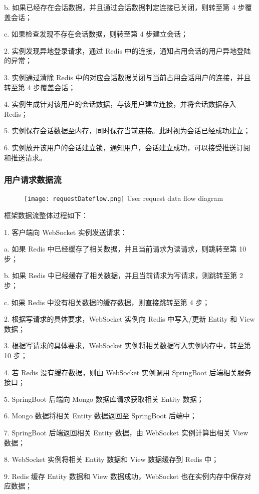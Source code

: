 \quad{}b. 如果已经存在会话数据，并且通过会话数据判定连接已关闭，则转至第 4 步覆盖会话；

\quad{}c. 如果检查发现不存在会话数据，则转至第 4 步建立会话；

2. 实例发现异地登录请求，通过 Redis 中的连接，通知占用会话的用户异地登陆的异常；

3. 实例通过清除 Redis 中的对应会话数据关闭与当前占用会话用户的连接，并且转至第 4 步覆盖会话；

4. 实例生成针对该用户的会话数据，与该用户建立连接，并将会话数据存入 Redis；

5. 实例保存会话数据至内存，同时保存当前连接。此时视为会话已经成功建立；

6. 实例放开该用户的会话建立锁，通知用户，会话建立成功，可以接受推送订阅和推送请求。
\subsubsection{用户请求数据流}
\begin{figure}[!htp]
  \centering
  \texttt{[image: requestDateflow.png]}
    {User request data flow diagram}
 \label{fig:requestDateflow}
\end{figure}
框架数据流整体过程如下：

1. 客户端向 WebSocket 实例发送请求：

\quad{}a. 如果 Redis 中已经缓存了相关数据，并且当前请求为读请求，则跳转至第 10 步；

\quad{}b. 如果 Redis 中已经缓存了相关数据，并且当前请求为写请求，则跳转至第 2 步；

\quad{}c. 如果 Redis 中没有相关数据的缓存数据，则直接跳转至第 4 步；

2. 根据写请求的具体要求，WebSocket 实例向 Redis 中写入/更新 Entity 和 View数据；

3. 根据写请求的具体要求，WebSocket 实例将相关数据写入实例内存中，转至第 10 步；

4. 若 Redis 没有缓存数据，则由 WebSocket 实例调用 SpringBoot 后端相关服务接口；

5. SpringBoot 后端向 Mongo 数据库请求获取相关 Entity 数据；

6. Mongo 数据将相关 Entity 数据返回至 SpringBoot 后端中；

7. SpringBoot 后端返回相关 Entity 数据，由 WebSocket 实例计算出相关 View 数据；

8. WebSocket 实例将相关 Entity 数据和 View 数据缓存到 Redis 中；

9. Redis 缓存 Entity 数据和 View 数据成功，WebSocket 也在实例内存中保存对应数据；

